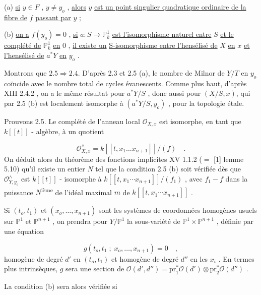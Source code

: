 (a) \underline{si} $y \in F$ , $y \neq y_o$ , \underline{alors} $y$ \underline{est un point singulier quadratique ordinaire de la fibre de} $f$ \underline{passant par} $y$ ;

(b) \underline{on a} $f(y_o) = 0$ , \underline{si} $a : S \to \mathbb{P}^1_k$ \underline{est l'isomorphisme naturel entre} $S$ \underline{et le complété de} $\mathbb{P}^1_k$ \underline{en} $0$ , \underline{il existe un} \underline{S-isomorphisme entre l'hensélisé de} $X$ \underline{en} $x$ \underline{et l'hensélisé de} $a^{*}Y$ \underline{en} $y_o$ .

Montrons que $2.5 \Rightarrow 2.4$. D'après 2.3 et 2.5 (a), le nombre de Milnor de $Y/T$ en $y_o$ coïncide avec le nombre total de cycles évanescents. Comme plus haut, d'après XIII 2.4.2 , on a le même résultat pour $a^{*}Y/S$ , donc aussi pour $(X/S,x)$, qui par 2.5 (b) est localement isomorphe à $(a^{*} Y/S,y_o)$ , pour la topologie étale.

Prouvons 2.5. Le complété de l'anneau local $\mathcal{O}_{X,x}$ est isomorphe, en tant que $k[[t]]$ - algèbre, à un quotient

\begin{equation*}
\mathcal{O}_{X,x}^{\wedge} = k[[t,x_1 \ldots x_{n+1}]]/(f) \quad .
\end{equation*}
On déduit alors du théorème des fonctions implicites XV 1.1.2 ($=$ [1] lemme 5.10) qu'il existe un entier $N$ tel que la condition 2.5 (b) soit vérifiée dès que $\mathcal{O}_{Y,y_o}^{\wedge}$ est $k[[t]]$ - isomorphe à $k[[t,x_1 \cdots x_{n+1}]]/(f_1)$ , avec $f_1 - f$ dans la puissance $N$\textsuperscript{ième} de l'idéal maximal $m$ de $k[[t,x_1 \cdots x_{n+1}]]$ .

Si $(t_o,t_1)$ et $(x_o,\ldots,x_{n+1})$ sont les systèmes de coordonnées homogènes usuels sur $\mathbb{P}^1$ et $\mathbb{P}^{n+1}$ , on prendra pour $Y/\mathbb{P}^1$ la sous-variété de $\mathbb{P}^1 \times \mathbb{P}^{n+1}$ , définie par une équation

\begin{equation}\tag{2.5.1}
g(t_o,t_1 \; ; \; x_o,\ldots,x_{n+1}) = 0 \quad ,
\end{equation}
homogène de degré $d'$ en $(t_o,t_1)$ et homogène de degré $d''$ en les $x_i$ . En termes plus intrinsèques, $g$ sera une section de $\mathcal{O}(d',d'') = \mathrm{pr}_1^{*} \mathcal{O}(d') \otimes \mathrm{pr}_2^{*} \mathcal{O}(d'')$ .



La condition (b) sera alors vérifiée si

